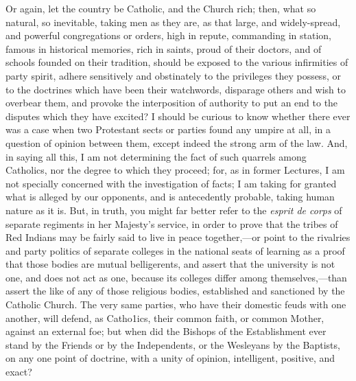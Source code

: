 Or again, let the country be Catholic, and the Church rich; then,
what so natural, so inevitable, taking men as they are, as that large,
and widely-spread, and powerful congregations or orders, high in
repute, commanding in station, famous in historical memories, rich in
saints, proud of their doctors, and of schools founded on their
tradition, should be exposed to the various infirmities of party
spirit, adhere sensitively and obstinately to the privileges they
possess, or to the doctrines which have been their watchwords,
disparage others and wish to overbear them, and provoke the interposition of authority to put an end to the disputes which they
have excited? I should be curious to know whether there ever was a
case when two Protestant sects or parties found any umpire at all, in
a question of opinion between them, except indeed the strong arm of
the law. And, in saying all this, I am not determining the fact of
such quarrels among Catholics, nor the degree to which they proceed;
for, as in former Lectures, I am not specially concerned with the
investigation of facts; I am taking for granted what is alleged by our
opponents, and is antecedently probable, taking human nature as it is.
But, in truth, you might far better refer to the \emph{esprit de corps}
of separate regiments in her Majesty's service, in order to prove that
the tribes of Red Indians may be fairly said to live in peace
together,—or point to the rivalries and party politics of separate
colleges in the national seats of learning as a proof that those
bodies are mutual belligerents, and assert that the university is not
one, and does not act as one, because its colleges differ among
themselves,—than assert the like of any of those religious bodies,
established and sanctioned by the Catholic Church. The very same
parties, who have their domestic feuds with one another, will defend,
as Catho1ics, their common faith, or common Mother, against an
external foe; but when did the Bishops of the Establishment ever stand
by the Friends or by the Independents, or the Wesleyans by the
Baptists, on any one point of doctrine, with a unity of opinion,
intelligent, positive, and exact?

